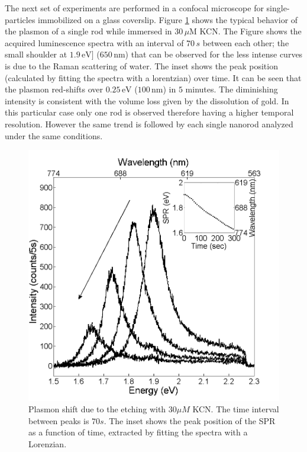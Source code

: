 \documentclass[twocolumn]{article}
\begin{document}
The next set of experiments are performed in a confocal microscope for
single-particles immobilized on a glass coverslip. Figure
\ref{fig:plasmon_single_rod} shows the typical behavior of the plasmon of a
single rod while immersed in $30\,\mu\textrm{M}$ KCN. The Figure shows the
acquired luminescence spectra with an interval of $70\,s$ between each other;
the small shoulder at $1.9\,\textrm{eV]}$ ($650\,\textrm{nm}$) that can be
observed for the less intense curves is due to the Raman scattering of water.
The inset shows the peak position (calculated by fitting the spectra with a
lorentzian) over time. It can be seen that the plasmon red-shifts over
$0.25\,\textrm{eV}$ ($100\,\textrm{nm}$) in $5$ minutes. The diminishing
intensity is consistent with the volume loss given by the dissolution of gold.
In this particular case only one rod is observed therefore having a higher
temporal resolution. However the same trend is followed by each single nanorod
analyzed under the same conditions.


\begin{figure}[hbt]
 \centering
 \includegraphics[width=0.95\linewidth]{plasmon_single_rod.png}
 \caption{Plasmon shift due to the etching with $30\mu M$ KCN. The time
 interval between peaks is $70s$. The inset shows the peak position of the SPR as a
 function of time, extracted by fitting the spectra with a Lorenzian.}
 \label{fig:plasmon_single_rod}
\end{figure}
\end{document}
